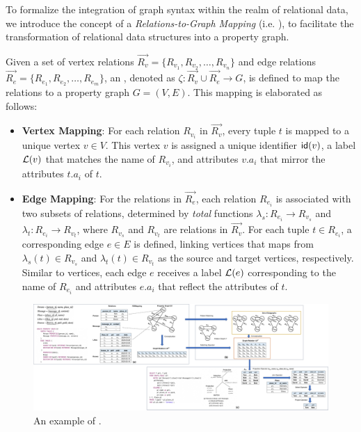 To formalize the integration of graph syntax within the realm of relational data, we introduce the concept of a \textit{Relations-to-Graph Mapping} (i.e. \rgmapping), to facilitate the transformation of relational data structures into a property graph.

\begin{definition}[\rgmapping, $\zeta$]
\label{def:rgmapping}
Given a set of vertex relations \(\vec{R_v} = \{R_{v_1}, R_{v_2}, \ldots, R_{v_n}\}\) and edge relations \(\vec{R_e} = \{R_{e_1}, R_{e_2}, \ldots, R_{e_m}\}\), an \rgmapping, denoted as \(\zeta: \vec{R_v} \cup \vec{R_e} \to G\), is defined to map the relations to a property graph \(G = (V, E)\). This mapping is elaborated as follows:

\begin{itemize}
\item \textbf{Vertex Mapping}: For each relation \(R_{v_i}\) in \(\vec{R_v}\), every tuple \(t\) is mapped to a unique vertex \(v \in V\). This vertex \(v\) is assigned a unique identifier \({\mathsf{id}}(v)\), a label \(\mathcal{L}(v)\) that matches the name of \(R_{v_i}\), and attributes \(v.a_i\) that mirror the attributes \(t.a_i\) of \(t\).

\item \textbf{Edge Mapping}: For the relations in \(\vec{R_e}\), each relation \(R_{e_i}\) is associated with two subsets of relations, determined by \emph{total} functions \(\lambda_s: R_{e_i} \to R_{v_s}\) and \(\lambda_t: R_{e_i} \to R_{v_t}\), where \(R_{v_s}\) and \(R_{v_t}\) are relations in \(\vec{R_v}\). For each tuple \(t \in R_{e_i}\), a corresponding edge \(e \in E\) is defined, linking vertices that \rgmapping maps from \(\lambda_s(t) \in R_{v_s}\) and \(\lambda_t(t) \in R_{v_t}\) as the source and target vertices, respectively. Similar to vertices, each edge \(e\) receives a label \(\mathcal{L}(e)\) corresponding to the name of \(R_{e_i}\) and attributes \(e.a_i\) that reflect the attributes of \(t\).

\end{itemize}
\end{definition}

\begin{figure}
    \centering
    \includegraphics[width=\linewidth]{./figures/rgmapping.pdf}
    \caption{An example of \rgmapping.}
    \label{fig:intro-rgmapping-example}
\end{figure}

